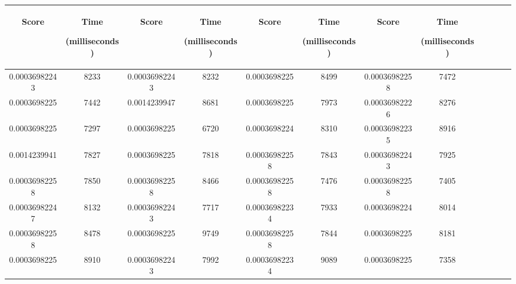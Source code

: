 \begin{table}[h]
  \centering
  \begin{tabular}{|c|c|c|c|c|c|c|c|c|c|c|c|} 
  \midrule
 \begin{sideways}Score\end{sideways}& \begin{sideways}Time\end{sideways} \begin{sideways} (milliseconds)\end{sideways}& \begin{sideways}Score\end{sideways}& \begin{sideways}Time\end{sideways}  \begin{sideways}(milliseconds)\end{sideways}& \begin{sideways}Score\end{sideways}& \begin{sideways}Time\end{sideways}  \begin{sideways}(milliseconds)\end{sideways}& \begin{sideways}Score\end{sideways}& \begin{sideways}Time\end{sideways}  \begin{sideways} (milliseconds)\end{sideways}\\
\midrule
0.00036982243&8233&0.00036982243&8232&0.0003698225&8499&0.00036982258&7472\\
\midrule
0.0003698225&7442&0.0014239947&8681&0.0003698225&7973&0.00036982226&8276\\
\midrule
0.0003698225&7297&0.0003698225&6720&0.0003698224&8310&0.00036982235&8916\\
\midrule
0.0014239941&7827&0.0003698225&7818&0.00036982258&7843&0.00036982243&7925\\
\midrule
0.00036982258&7850&0.00036982258&8466&0.00036982258&7476&0.00036982258&7405\\
\midrule
0.00036982247&8132&0.00036982243&7717&0.00036982234&7933&0.0003698224&8014\\
\midrule
0.00036982258&8478&0.0003698225&9749&0.00036982258&7844&0.0003698225&8181\\
\midrule
0.0003698225&8910&0.00036982243&7992&0.00036982234&9089&0.0003698225&7358\\

\end{tabular}
\end{table}
